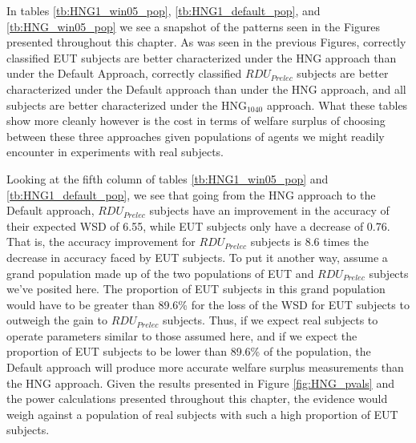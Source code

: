 \documentclass[../main.tex]{subfiles}
\begin{document}
In tables \ref{tb:HNG1_win05_pop}, \ref{tb:HNG1_default_pop}, and \ref{tb:HNG_win05_pop} we see a snapshot of the patterns seen in the Figures presented throughout this chapter.
As was seen in the previous Figures, correctly classified EUT subjects are better characterized under the HNG approach than under the Default Approach, correctly classified $\mathit{RDU_{Prelec}}$ subjects are better characterized under the Default approach than under the HNG approach, and all subjects are better characterized under the $\text{HNG}_{1040}$ approach.
What these tables show more cleanly however is the cost in terms of welfare surplus of choosing between these three approaches given populations of agents we might readily encounter in experiments with real subjects.

Looking at the fifth column of tables \ref{tb:HNG1_win05_pop} and \ref{tb:HNG1_default_pop}, we see that going from the HNG approach to the Default approach, $\mathit{RDU_{Prelec}}$ subjects have an improvement in the accuracy of their expected WSD of 6.55, while EUT subjects only have a decrease of 0.76.
That is, the accuracy improvement for $\mathit{RDU_{Prelec}}$ subjects is 8.6 times the decrease in accuracy faced by EUT subjects.
To put it another way, assume a grand population made up of the two populations of EUT and $\mathit{RDU_{Prelec}}$ subjects we've posited here.
The proportion of EUT subjects in this grand population would have to be greater than 89.6\% for the loss of the WSD for EUT subjects to outweigh the gain to $\mathit{RDU_{Prelec}}$ subjects.{\footnotemark}
Thus, if we expect real subjects to operate parameters similar to those assumed here, and if we expect the proportion of EUT subjects to be lower than  89.6\% of the population, the Default approach will produce more accurate welfare surplus measurements than the HNG approach.
Given the results presented in Figure \ref{fig:HNG_pvals} and the power calculations presented throughout this chapter, the evidence would weigh against a population of real subjects with such a high proportion of EUT subjects.

\addtocounter{footnote}{-1}
\end{document}
